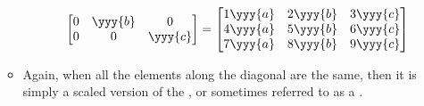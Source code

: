 \begin{itemize}
\begin{itemize}
\begin{itemize}
\[\begin{bmatrix}
        0 & \yyy{b} & 0 \\
        0 & 0 & \yyy{c}
        \end{bmatrix}
        =
        \begin{bmatrix}
          1\yyy{a} & 2\yyy{b}  & 3\yyy{c} \\
          4\yyy{a} & 5\yyy{b} & 6\yyy{c} \\
          7\yyy{a} & 8\yyy{b} & 9\yyy{c} 
          \end{bmatrix}
        \]%
      \end{itemize}
    \item Again, when all the elements along the diagonal are the same, then it is simply a scaled version of the \hyperref[Identity and Zero Matrices]{}, or sometimes referred to as a \hyperref[scaled matrix]{}.
  \end{itemize}


\end{itemize}
